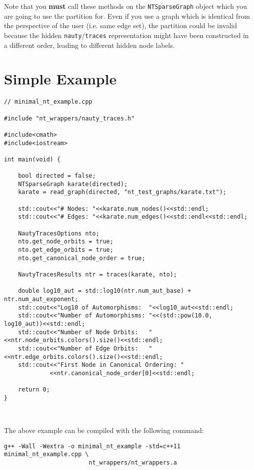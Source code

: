 \documentclass{article}
\begin{document}
Note that you \textbf{must} call these methods on the \verb|NTSparseGraph| object which you are going to use the partition for. Even if you use a graph which is identical from the perspective of the user (i.e. same edge set), the partition could be invalid because the hidden \verb|nauty|/\verb|traces| representation might have been constructed in a different order, leading to different hidden node labels.

\newpage

\section{Simple Example}\label{sec:full_example}

\begin{verbatim}
// minimal_nt_example.cpp

#include "nt_wrappers/nauty_traces.h"

#include<cmath>
#include<iostream>

int main(void) {

    bool directed = false;
    NTSparseGraph karate(directed);
    karate = read_graph(directed, "nt_test_graphs/karate.txt");

    std::cout<<"# Nodes: "<<karate.num_nodes()<<std::endl;
    std::cout<<"# Edges: "<<karate.num_edges()<<std::endl<<std::endl;

    NautyTracesOptions nto;
    nto.get_node_orbits = true;
    nto.get_edge_orbits = true;
    nto.get_canonical_node_order = true;
    
    NautyTracesResults ntr = traces(karate, nto);
    
    double log10_aut = std::log10(ntr.num_aut_base) + ntr.num_aut_exponent;
    std::cout<<"Log10 of Automorphisms:  "<<log10_aut<<std::endl;
    std::cout<<"Number of Automorphisms: "<<(std::pow(10.0, log10_aut))<<std::endl;
    std::cout<<"Number of Node Orbits:   "<<ntr.node_orbits.colors().size()<<std::endl;
    std::cout<<"Number of Edge Orbits:   "<<ntr.edge_orbits.colors().size()<<std::endl;
    std::cout<<"First Node in Canonical Ordering: "
             <<ntr.canonical_node_order[0]<<std::endl;

    return 0;
}
\end{verbatim}

\ 

The above example can be compiled with the following command:

\begin{verbatim}
g++ -Wall -Wextra -o minimal_nt_example -std=c++11 minimal_nt_example.cpp \
                        nt_wrappers/nt_wrappers.a
\end{verbatim}
\end{document}
